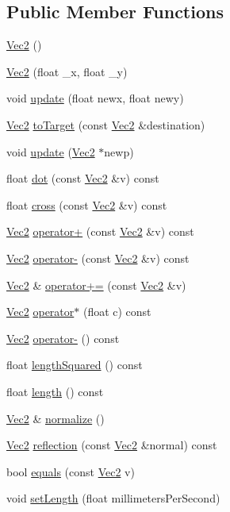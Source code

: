 \subsection*{Public Member Functions}
\begin{DoxyCompactItemize}
\item 
\hyperlink{class_vec2_a76080feed7005893ecc634f903cfbae0}{Vec2} ()
\item 
\hyperlink{class_vec2_ab4b119971b830689f9a562d5183dce92}{Vec2} (float \+\_\+x, float \+\_\+y)
\item 
void \hyperlink{class_vec2_a5f0514a17c52784e5f6d5b10911ee996}{update} (float newx, float newy)
\item 
\hyperlink{class_vec2}{Vec2} \hyperlink{class_vec2_af5391376cde50cef728ad4318c29dad7}{to\+Target} (const \hyperlink{class_vec2}{Vec2} \&destination)
\item 
void \hyperlink{class_vec2_a8464794a7667794393aa347a5ba505cc}{update} (\hyperlink{class_vec2}{Vec2} $\ast$newp)
\item 
float \hyperlink{class_vec2_aafb32f618ad13d0d98e6921f2aef53a3}{dot} (const \hyperlink{class_vec2}{Vec2} \&v) const 
\item 
float \hyperlink{class_vec2_a1aedad72c952aaef4a56844719ee2449}{cross} (const \hyperlink{class_vec2}{Vec2} \&v) const 
\item 
\hyperlink{class_vec2}{Vec2} \hyperlink{class_vec2_a55982187727e6fef357273be8e269526}{operator+} (const \hyperlink{class_vec2}{Vec2} \&v) const 
\item 
\hyperlink{class_vec2}{Vec2} \hyperlink{class_vec2_adfaf0492c67e51fc89e3f7f484519de7}{operator-\/} (const \hyperlink{class_vec2}{Vec2} \&v) const 
\item 
\hyperlink{class_vec2}{Vec2} \& \hyperlink{class_vec2_a7f062667506f94bc207bdf492ca5b89c}{operator+=} (const \hyperlink{class_vec2}{Vec2} \&v)
\item 
\hyperlink{class_vec2}{Vec2} \hyperlink{class_vec2_a41b7293b6a348ee4d33b8fa396db9adb}{operator$\ast$} (float c) const 
\item 
\hyperlink{class_vec2}{Vec2} \hyperlink{class_vec2_a39640496ed941cf3d7e8cc7ee96eea36}{operator-\/} () const 
\item 
float \hyperlink{class_vec2_a65a6009cc22511950a84e6cadf07ae27}{length\+Squared} () const 
\item 
float \hyperlink{class_vec2_a83adaf3f787cfb5de4576073898b93db}{length} () const 
\item 
\hyperlink{class_vec2}{Vec2} \& \hyperlink{class_vec2_a3bd229e267428daddca2645a7679bb8e}{normalize} ()
\item 
\hyperlink{class_vec2}{Vec2} \hyperlink{class_vec2_accb52253548abc22b6cadc167cd883b0}{reflection} (const \hyperlink{class_vec2}{Vec2} \&normal) const 
\item 
bool \hyperlink{class_vec2_a94ced62f7c39fc9ae2989008146d7a78}{equals} (const \hyperlink{class_vec2}{Vec2} v)
\item 
void \hyperlink{class_vec2_a2ed56672ba73c4eef930c71526517cfe}{set\+Length} (float millimeters\+Per\+Second)
\end{DoxyCompactItemize}
